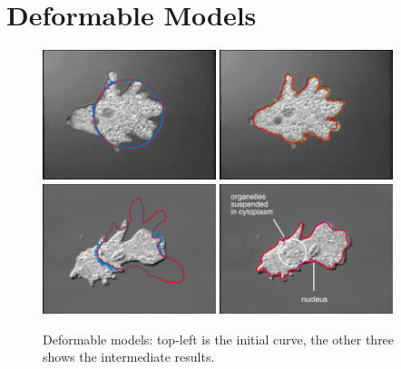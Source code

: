 \documentclass[a4paper]{article}
\begin{document}
	\section{Deformable Models}
	\begin{figure}[htbp]
	\centering
	\includegraphics[width=0.45\textwidth]{./figures/defom1.png}
	\includegraphics[width=0.45\textwidth]{./figures/defom2.png}
	\includegraphics[width=0.45\textwidth]{./figures/defom148.png}
	\includegraphics[width=0.45\textwidth]{./figures/defom186.png}
	\caption{Deformable models: top-left is the initial curve, the other three shows the intermediate results.}
\end{figure}
\end{document}
